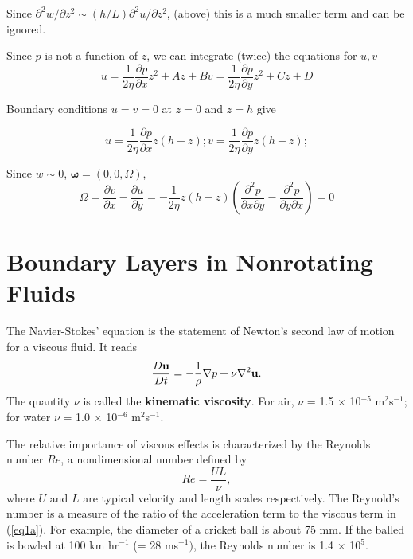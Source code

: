 \documentclass[10pt]{report}
\begin{document}
\begin{answer5}
		Since $\partial^2 w/\partial z^2 \sim (h/L) \partial^2 u/\partial z^2 $, (above)
		this is a much smaller term and can be ignored.


		Since $p$ is not a function of $z$, we can integrate (twice) the equations for $u,v$
		\begin{equation*}
			u=\frac{1}{2\eta}\frac{\partial p}{\partial x} z^2 + Az + B
			v=\frac{1}{2\eta}\frac{\partial p}{\partial y} z^2 + Cz + D
		\end{equation*}

		Boundary conditions $u=v=0$ at $z=0$ and $z=h$ give

		\begin{equation*}
			u = \frac{1}{2\eta}\frac{\partial p}{\partial x} z(h-z);
			v = \frac{1}{2\eta}\frac{\partial p}{\partial y} z(h-z);
		\end{equation*}

		Since $w\sim 0$, $\mathbf{\omega} = (0,0,\Omega)$,
		\begin{equation*}
			\Omega = \frac{\partial v}{\partial x} - \frac{\partial u}{\partial y} =
			    -\frac{1}{2\eta}z(h-z) \left( \frac{\partial^2 p}{\partial x \partial y} -
			    \frac{\partial^2 p}{\partial y \partial x}  \right) = 0
		\end{equation*}


\end{answer5}




\cleardoublepage
\chapter{Boundary Layers in Nonrotating Fluids}
The Navier-Stokes' equation is the statement of Newton's second law of
motion for a viscous fluid. It reads
\begin{equation}
\label{eq1a}
\frac{D{{\bf u}}}{Dt}=-\frac{1}{\rho }\nabla p+\nu \nabla ^2{{\bf
u}}.
\end{equation}
The quantity $\nu $ is called the \textbf{kinematic viscosity}. For air,
$\nu $ = 1.5 $\times $ 10$^{-5}$ m$^{2}$s$^{-1}$; for water $\nu $ = 1.0
$\times $ 10$^{-6}$ m$^{2}$s$^{-1}$.

The relative importance of viscous effects is characterized by the Reynolds
number $Re$, a nondimensional number defined by
\[
Re=\frac{UL}{\nu },
\]
where $U$ and $L$ are typical velocity and length scales respectively. The
Reynold's number is a measure of the ratio of the acceleration term to the
viscous term in (\ref{eq1a}). For example, the diameter of a cricket ball
is about 75 mm. If the balled is bowled at 100 km hr$^{-1}$ (= 28
ms$^{-1})$, the Reynolds number is 1.4 $\times $ 10$^{5}$.
\end{document}
